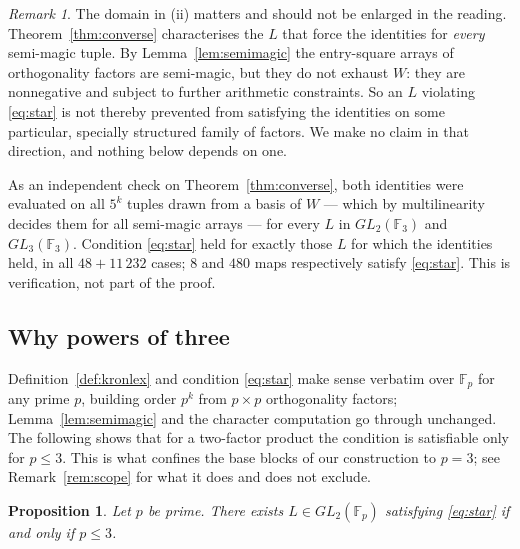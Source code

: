 \documentclass[11pt,a4paper]{amsart}
\theoremstyle{plain}
\newtheorem{proposition}[theorem]{Proposition}
\theoremstyle{definition}
\theoremstyle{remark}
\newtheorem{remark}[theorem]{Remark}
\newcommand{\FF}{\mathbb{F}}
\begin{document}
\begin{remark}\label{rem:sharp}
The domain in (ii) matters and should not be enlarged in the reading.
Theorem~\ref{thm:converse} characterises the $L$ that force the identities for
\emph{every} semi-magic tuple. By Lemma~\ref{lem:semimagic} the entry-square
arrays of orthogonality factors are semi-magic, but they do not exhaust $W$:
they are nonnegative and subject to further arithmetic constraints. So an $L$
violating \eqref{eq:star} is not thereby prevented from satisfying the
identities on some particular, specially structured family of factors. We make
no claim in that direction, and nothing below depends on one.

As an independent check on Theorem~\ref{thm:converse}, both identities were
evaluated on all $5^k$ tuples drawn from a basis of $W$ --- which by
multilinearity decides them for all semi-magic arrays --- for every $L$ in
$GL_2(\FF_3)$ and $GL_3(\FF_3)$. Condition \eqref{eq:star} held for exactly
those $L$ for which the identities held, in all $48+11\,232$ cases; $8$ and
$480$ maps respectively satisfy \eqref{eq:star}. This is verification, not part
of the proof.
\end{remark}

\subsection{Why powers of three}

Definition~\ref{def:kronlex} and condition \eqref{eq:star} make sense verbatim
over $\FF_p$ for any prime $p$, building order $p^k$ from $p\times p$
orthogonality factors; Lemma~\ref{lem:semimagic} and the character computation
go through unchanged. The following shows that for a two-factor product the
condition is satisfiable only for $p\le3$. This is what confines the base
blocks of our construction to $p=3$; see Remark~\ref{rem:scope} for what it
does and does not exclude.

\begin{proposition}\label{prop:whythree}
Let $p$ be prime. There exists $L\in GL_2(\FF_p)$ satisfying \eqref{eq:star} if
and only if $p\le3$.
\end{proposition}
\end{document}
